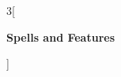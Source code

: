 \documentclass[12pt]{article}
\begin{document}
\raggedright
\newcommand\bracket[1]{$\langle${#1}$\rangle$}
\def\psam{+\bracket{\footnotesize\textsc{Spell ability modifier}}}
\def\spelldc{\bracket{\footnotesize\textsc{Spell DC}}}
\def\satk{\bracket{\footnotesize\textsc{Spell Attack}}}
\columnsep=25pt
\begin{multicols}{3}[\begin{center}\LARGE \textbf{Spells and Features} \end{center}]

\end{multicols}
\end{document}
